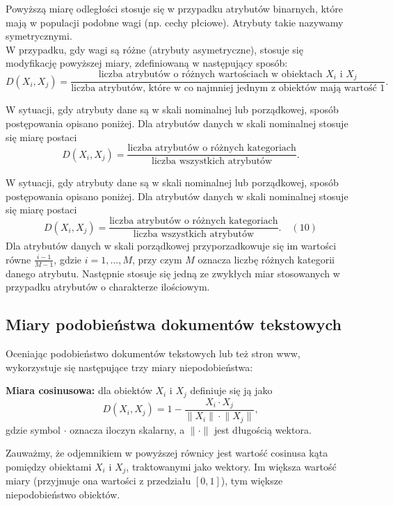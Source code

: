 \documentclass{article}
\begin{document}
Powyższą miarę odległości stosuje się w przypadku atrybutów binarnych, które mają w populacji podobne wagi (np. cechy płciowe). Atrybuty takie nazywamy symetrycznymi. \\

W przypadku, gdy wagi są różne (atrybuty asymetryczne), stosuje się modyfikację powyższej miary, zdefiniowaną w następujący sposób:
\[
D(X_i, X_j) = \frac{\text{liczba atrybutów o różnych wartościach w obiektach } X_i \text{ i } X_j}{\text{liczba atrybutów, które w co najmniej jednym z obiektów mają wartość } 1}.
\]


W sytuacji, gdy atrybuty dane są w skali nominalnej lub porządkowej, sposób postępowania opisano poniżej. Dla atrybutów danych w skali nominalnej stosuje się miarę postaci
\[
D(X_i, X_j) = \frac{\text{liczba atrybutów o różnych kategoriach}}{\text{liczba wszystkich atrybutów}}.
\]

W sytuacji, gdy atrybuty dane są w skali nominalnej lub porządkowej, sposób postępowania opisano poniżej. Dla atrybutów danych w skali nominalnej stosuje się miarę postaci
\[
D(X_i, X_j) = \frac{\text{liczba atrybutów o różnych kategoriach}}{\text{liczba wszystkich atrybutów}}. \quad (10)
\]
Dla atrybutów danych w skali porządkowej przyporzadkowuje się im wartości równe \(\frac{i-1}{M-1}\), gdzie \(i = 1, \ldots, M\), przy czym \(M\) oznacza liczbę różnych kategorii danego atrybutu. Następnie stosuje się jedną ze zwykłych miar stosowanych w przypadku atrybutów o charakterze ilościowym.



\subsection {Miary podobieństwa dokumentów tekstowych}

Oceniając podobieństwo dokumentów tekstowych lub też stron www, wykorzystuje się następujące trzy miary niepodobieństwa:

\textbf{Miara cosinusowa:} dla obiektów $X_i$ i $X_j$ definiuje się ją jako
\begin{equation}
    D(X_i, X_j) = 1 - \frac{X_i \cdot X_j}{\lVert X_i \rVert \cdot \lVert X_j \rVert}, \tag{1}
\end{equation}
gdzie symbol $\cdot$ oznacza iloczyn skalarny, a $\lVert \cdot \rVert$ jest długością wektora.

Zauważmy, że odjemnikiem w powyższej równicy jest wartość cosinusa kąta pomiędzy obiektami $X_i$ i $X_j$, traktowanymi jako wektory. Im większa wartość miary (przyjmuje ona wartości z przedziału $[0, 1]$), tym większe niepodobieństwo obiektów.
\end{document}
